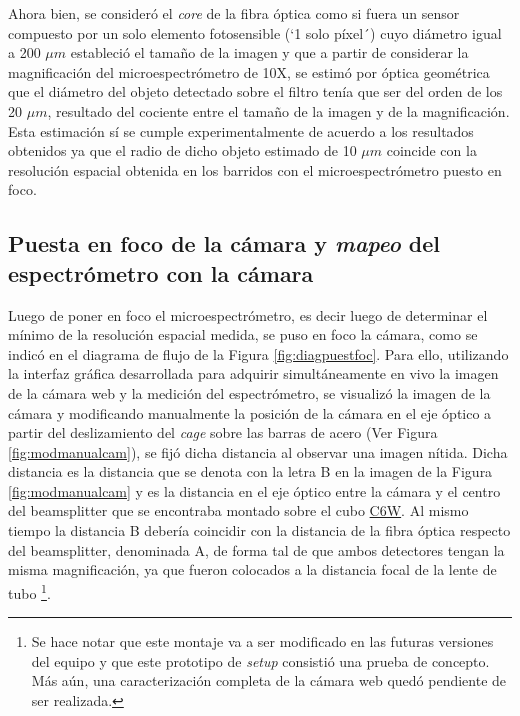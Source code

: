 Ahora bien, se consideró el \textit{core} de la fibra óptica como si fuera un sensor compuesto por un solo elemento fotosensible (`1 solo píxel´) cuyo diámetro igual a 200 $\mu m$ estableció el tamaño de la imagen y que a partir de considerar la magnificación del microespectrómetro de 10X, se estimó por óptica geométrica que el diámetro del objeto detectado sobre el filtro tenía que ser del orden de los 20 $\mu m$, resultado del cociente entre el tamaño de la imagen y de la magnificación. Esta estimación sí se cumple experimentalmente de acuerdo a los resultados obtenidos ya que el radio de dicho objeto estimado de 10 $\mu m$ coincide con la resolución espacial obtenida en los barridos con el microespectrómetro puesto en foco. 


\singlespacing
\subsection{Puesta en foco de la cámara y \textit{mapeo} del espectrómetro con la cámara}
\label{sec:fococam}

\hspace{0.5cm}Luego de poner en foco el microespectrómetro, es decir luego de determinar el mínimo de la resolución espacial medida, se puso en foco la cámara, como se indicó en el diagrama de flujo de la Figura \ref{fig:diagpuestfoc}. Para ello, utilizando la interfaz gráfica desarrollada para adquirir simultáneamente en vivo la imagen de la cámara web y la medición del espectrómetro, se visualizó la imagen de la cámara y modificando manualmente la posición de la cámara en el eje óptico a partir del deslizamiento del \textit{cage} sobre las barras de acero (Ver Figura \ref{fig:modmanualcam}), se fijó dicha distancia al observar una imagen nítida. Dicha distancia es la distancia que se denota con la letra B en la imagen de  la Figura \ref{fig:modmanualcam} y es la distancia en el eje óptico entre la cámara y el centro del beamsplitter que se encontraba montado sobre el cubo \href{https://www.thorlabs.com/thorproduct.cfm?partnumber=C6W}{C6W}. Al mismo tiempo la distancia B debería coincidir con la distancia de la fibra óptica respecto del beamsplitter, denominada A, de forma tal de que ambos detectores tengan la misma magnificación, ya que fueron colocados a la distancia focal de la lente de tubo \footnote{Se hace notar que este montaje va a ser modificado en las futuras versiones del equipo y que este prototipo de \textit{setup} consistió una prueba de concepto. Más aún, una caracterización completa de la cámara web quedó pendiente de ser realizada.}.  

